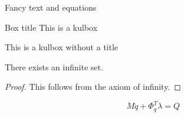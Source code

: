 \documentclass[11pt,t]{beamer}
\begin{document}
\begin{frame}{Fancy text and equations}
	\begin{center}
		\begin{kulbox}{Box title}
			This is a kulbox
		\end{kulbox}
		\begin{kulbox}{}
			This is a kulbox without a title
		\end{kulbox}
	\end{center}
	\begin{theorem}
		There exists an infinite set.
	\end{theorem}
	\begin{proof}
		This follows from the axiom of infinity.
	\end{proof}
	\vspace{4mm}
	\begin{equation}
		M \ddot{q} + \mathsf{\Phi}_{q}^T \lambda = Q
	\end{equation}
\end{frame}
\end{document}
